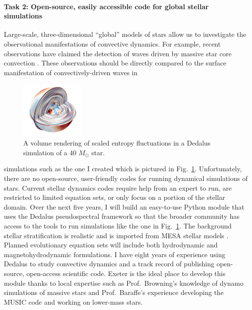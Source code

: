 \documentclass[12pt]{article}
\begin{document}
\paragraph*{Task 2: Open-source, easily accessible code for global stellar simulations}
Large-scale, three-dimensional ``global'' models of stars allow us to investigate the observational manifestations of convective dynamics.
For example, recent observations have claimed the detection of waves driven by massive star core convection \citep{bowman_etal_2019}.
These observations should be directly compared to the surface manifestation of convectively-driven waves in 
\begin{figure}
	\begin{center}
	\vspace{-30pt}
    \includegraphics[width=0.28\textwidth]{./figs/massive_star.png}
	\vspace{-20pt}
	\end{center}
    \caption{ A volume rendering of scaled entropy fluctuations in a Dedalus simulation of a 40 $M_\odot$ star.
	\label{fig:massive_star} }
	\vspace{-10pt}
\end{figure}
simulations such as the one I created which is pictured in Fig.~\ref{fig:massive_star}.
Unfortunately, there are no open-source, user-friendly codes for running dynamical simulations of stars.
Current stellar dynamics codes require help from an expert to run, are restricted to limited equation sets, or only focus on a portion of the stellar domain.
Over the next five years, I will build an easy-to-use Python module that uses the Dedalus pseudospectral framework \citep{burns_etal_2020} so that the broader community has access to the tools to run simulations like the one in Fig.~\ref{fig:massive_star}.
The background stellar stratification is realistic and is imported from MESA stellar models \citep{paxton_etal_2011}.
Planned evolutionary equation sets will include both hydrodynamic and magnetohydrodynamic formulations. %
I have eight years of experience using Dedalus to study convective dynamics and a track record of publishing open-source, open-access scientific code.
Exeter is the ideal place to develop this module thanks to local expertise such as Prof.~Browning's knowledge of dynamo simulations of massive stars and Prof.~Baraffe's experience developing the MUSIC code and working on lower-mass stars.
\end{document}
